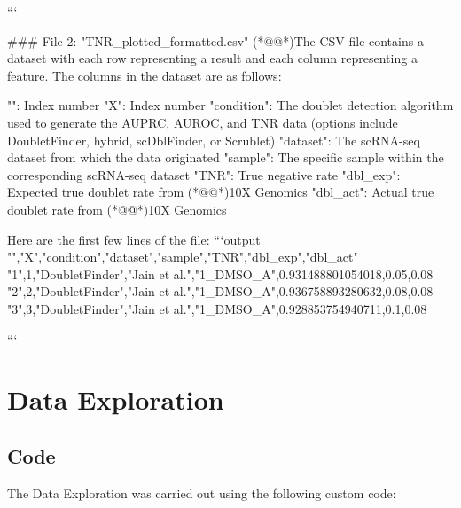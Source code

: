 \documentclass[11pt]{article}
\begin{document}
\begin{codeoutput}
```

\#\#\# File 2: "TNR\_plotted\_formatted.csv"
(*@@*)The CSV file contains a dataset with each row representing a result and each column representing a feature. The columns in the dataset are as follows:

"": Index number
"X": Index number
"condition": The doublet detection algorithm used to generate the AUPRC, AUROC, and TNR data (options include DoubletFinder, hybrid, scDblFinder, or Scrublet)
"dataset": The scRNA-seq dataset from which the data originated
"sample": The specific sample within the corresponding scRNA-seq dataset
"TNR": True negative rate
"dbl\_exp": Expected true doublet rate from (*@@*)10X Genomics
"dbl\_act": Actual true doublet rate from (*@@*)10X Genomics


Here are the first few lines of the file:
```output
"","X","condition","dataset","sample","TNR","dbl\_exp","dbl\_act"
"1",1,"DoubletFinder","Jain et al.","1\_DMSO\_A",0.931488801054018,0.05,0.08
"2",2,"DoubletFinder","Jain et al.","1\_DMSO\_A",0.936758893280632,0.08,0.08
"3",3,"DoubletFinder","Jain et al.","1\_DMSO\_A",0.928853754940711,0.1,0.08

```


\end{codeoutput}

\section{Data Exploration}
\subsection{{Code}}
The Data Exploration was carried out using the following custom code:
\end{document}

